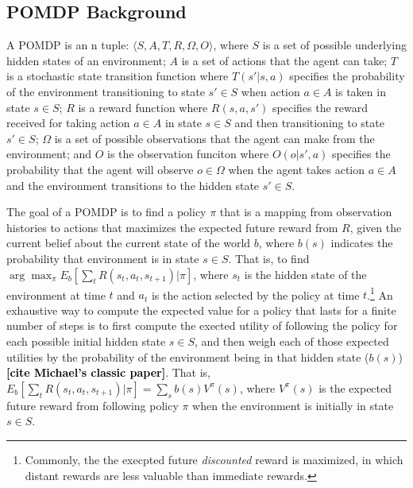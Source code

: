 \documentclass[11pt]{article}
\newcommand\ncitea[1]{\textcolor{black}{{\bf [cite #1]}}}
\begin{document}

\subsection{POMDP Background}
A POMDP is an n tuple: $\langle S,A,T,R,\Omega,O \rangle$, where $S$ is a set of possible underlying hidden states of an environment; $A$ is a set of actions that the agent can take; $T$ is a stochastic state transition function where $T(s' | s, a)$ specifies the probability of the environment transitioning to state $s' \in S$ when action $a \in A$ is taken in state $s \in S$; $R$ is a reward function where $R(s, a, s')$ specifies the reward received for taking action $a \in A$ in state $s \in S$ and then transitioning to state $s' \in S$; $\Omega$ is a set of possible observations that the agent can make from the environment; and $O$ is the observation funciton where $O(o | s', a)$ specifies the probability that the agent will observe $o \in \Omega$ when the agent takes action $a \in A$ and the environment transitions to the hidden state $s' \in S$.

The goal of a POMDP is to find a policy $\pi$ that is a mapping from observation histories to actions that maximizes the expected future reward from $R$, given the current belief about the current state of the world $b$, where $b(s)$ indicates the probability that environment is in state $s \in S$. That is, to find $\arg\max_\pi E_b[\sum_t R(s_t,a_t,s_{t+1}) | \pi]$, where $s_t$ is the hidden state of the environment at time $t$ and $a_t$ is the action selected by the policy at time $t$.\footnote{Commonly, the the execpted future {\em discounted} reward is maximized, in which distant rewards are less valuable than immediate rewards.} An exhaustive way to compute the expected value for a policy that lasts for a finite number of steps is to first compute the exected utility of following the policy for each possible initial hidden state $s \in S$, and then weigh each of those expected utilities by the probability of the environment being in that hidden state ($b(s)$) \ncitea{Michael's classic paper}. That is, $E_b[\sum_t R(s_t,a_t,s_{t+1}) | \pi] = \sum_s b(s) V^\pi(s)$, where $V^\pi(s)$ is the expected future reward from following policy $\pi$ when the environment is initially in state $s \in S$.
\end{document}
